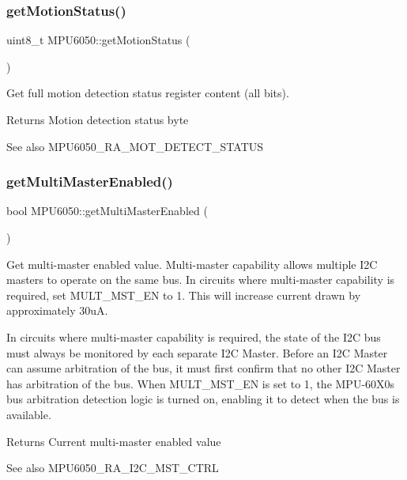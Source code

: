 \subsubsection{\texorpdfstring{getMotionStatus()}{getMotionStatus()}}
{\footnotesize\ttfamily uint8\+\_\+t M\+P\+U6050\+::get\+Motion\+Status (\begin{DoxyParamCaption}{ }\end{DoxyParamCaption})}

Get full motion detection status register content (all bits). \begin{DoxyReturn}{Returns}
Motion detection status byte 
\end{DoxyReturn}
\begin{DoxySeeAlso}{See also}
M\+P\+U6050\+\_\+\+R\+A\+\_\+\+M\+O\+T\+\_\+\+D\+E\+T\+E\+C\+T\+\_\+\+S\+T\+A\+T\+US 
\end{DoxySeeAlso}
\mbox{\label{class_m_p_u6050_aa88483068837bd9bc9c9f6c59a7a79b7}} 
\subsubsection{\texorpdfstring{getMultiMasterEnabled()}{getMultiMasterEnabled()}}
{\footnotesize\ttfamily bool M\+P\+U6050\+::get\+Multi\+Master\+Enabled (\begin{DoxyParamCaption}{ }\end{DoxyParamCaption})}

Get multi-\/master enabled value. Multi-\/master capability allows multiple I2C masters to operate on the same bus. In circuits where multi-\/master capability is required, set M\+U\+L\+T\+\_\+\+M\+S\+T\+\_\+\+EN to 1. This will increase current drawn by approximately 30uA.

In circuits where multi-\/master capability is required, the state of the I2C bus must always be monitored by each separate I2C Master. Before an I2C Master can assume arbitration of the bus, it must first confirm that no other I2C Master has arbitration of the bus. When M\+U\+L\+T\+\_\+\+M\+S\+T\+\_\+\+EN is set to 1, the M\+P\+U-\/60\+X0\textquotesingle{}s bus arbitration detection logic is turned on, enabling it to detect when the bus is available.

\begin{DoxyReturn}{Returns}
Current multi-\/master enabled value 
\end{DoxyReturn}
\begin{DoxySeeAlso}{See also}
M\+P\+U6050\+\_\+\+R\+A\+\_\+\+I2\+C\+\_\+\+M\+S\+T\+\_\+\+C\+T\+RL 
\end{DoxySeeAlso}
\mbox{\label{class_m_p_u6050_af2820067b73f177d985ed81e894281b0}} 

